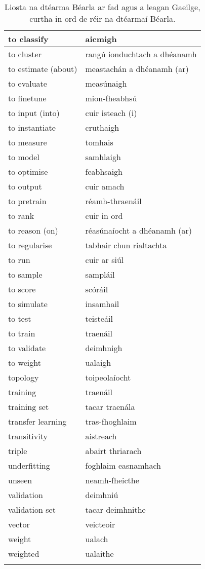 \documentclass{article}
\begin{document}
\begin{longtable}{|l|l|}
		to classify&aicmigh\\ \hline 
		to cluster&rangú ionduchtach a dhéanamh\\ \hline 
		to estimate (about)&meastachán a dhéanamh (ar)\\ \hline 
		to evaluate&measúnaigh\\ \hline 
		to finetune&mion-fheabhsú\\ \hline 
		to input (into)&cuir isteach (i)\\ \hline 
		to instantiate&cruthaigh\\ \hline 
		to measure&tomhais\\ \hline 
		to model&samhlaigh\\ \hline 
		to optimise&feabhsaigh\\ \hline 
		to output&cuir amach\\ \hline 
		to pretrain&réamh-thraenáil\\ \hline 
		to rank&cuir in ord\\ \hline 
		to reason (on)&réasúnaíocht a dhéanamh (ar)\\ \hline 
		to regularise&tabhair chun rialtachta\\ \hline 
		to run&cuir ar siúl\\ \hline 
		to sample&sampláil\\ \hline 
		to score&scóráil\\ \hline 
		to simulate&insamhail\\ \hline 
		to test&teisteáil\\ \hline 
		to train&traenáil\\ \hline 
		to validate&deimhnigh\\ \hline 
		to weight&ualaigh\\ \hline 
		topology&toipeolaíocht\\ \hline 
		training&traenáil\\ \hline 
		training set&tacar traenála\\ \hline 
		transfer learning&tras-fhoghlaim\\ \hline 
		transitivity&aistreach\\ \hline 
		triple&abairt thriarach\\ \hline 
		underfitting&foghlaim easnamhach\\ \hline 
		unseen&neamh-fheicthe\\ \hline 
		validation&deimhniú\\ \hline 
		validation set&tacar deimhnithe\\ \hline 
		vector&veicteoir\\ \hline 
		weight&ualach\\ \hline 
		weighted&ualaithe\\ \hline 
\caption{Liosta na dtéarma Béarla ar fad agus a leagan Gaeilge, curtha in ord de réir na dtéarmaí Béarla.}
\label{tab-terms-en-ga}
\end{longtable}
\end{document}
